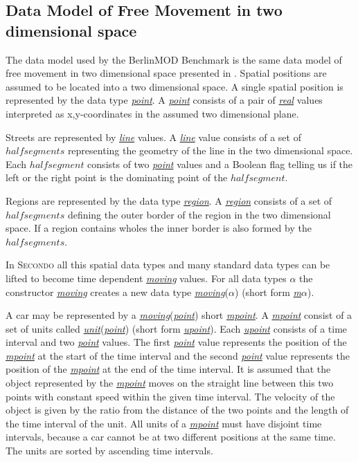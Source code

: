 \documentclass[a4paper]{article}
\newcommand{\secondo}{\textsc{Secondo}}
\newcommand{\bmodb} {BerlinMOD Benchmark}
\newcommand{\dt}[1]{\textsl{\underline{#1}}}
\begin{document}
\subsection{Data Model of Free Movement in two dimensional space}
\label{sec:bmodbdatamod}
The data model used by the \bmodb{} is the same data model of free movement in
two dimensional space presented in \cite{594784,335426,352963}. Spatial
positions are assumed to be located into a two dimensional space. A single spatial
position is represented by the data type \dt{point}. A \dt{point} consists of a pair of
\dt{real} values interpreted as x,y-coordinates in the assumed two dimensional plane.

Streets are represented by \dt{line} values. A \dt{line} value consists of a set
of $half segments$ representing the geometry of the line in the two dimensional space.
Each $half segment$ consists of two \dt{point} values and a Boolean flag telling us
if the left or the right point is the dominating point of the $half segment$.

Regions are represented by the data type \dt{region}. A \dt{region} consists of
a set of $half segments$ defining the outer border of the region in
the two dimensional space. If a region contains wholes the inner border is also
formed by the $half segments$.

In \secondo{} all this spatial data types and many standard data types can be
lifted to become time dependent \dt{moving} values. For all data types \dt{$\alpha$}
the constructor \dt{moving} creates a new data type \dt{moving}(\dt{$\alpha$})
(short form \dt{m$\alpha$}).

A car may be represented by a \dt{moving}(\dt{point}) short \dt{mpoint}.
A \dt{mpoint} consist of a set of units called
\dt{unit}(\dt{point}) (short form \dt{upoint}). Each \dt{upoint} consists of a time
interval and two \dt{point} values. The first \dt{point} value represents the
position of the \dt{mpoint} at the start of the time interval and the second
\dt{point} value represents the position of the \dt{mpoint} at the end of the
time interval. It is assumed that the object represented by the \dt{mpoint}
moves on the straight line between this two points with constant speed within the
given time interval. The velocity of the object is given by the ratio from the
distance of the two points and the length of the time interval of the unit.
All units of a \dt{mpoint} must have disjoint time intervals, because a car
cannot be at two different positions at the same time.
The units are sorted by ascending time intervals.
\end{document}
